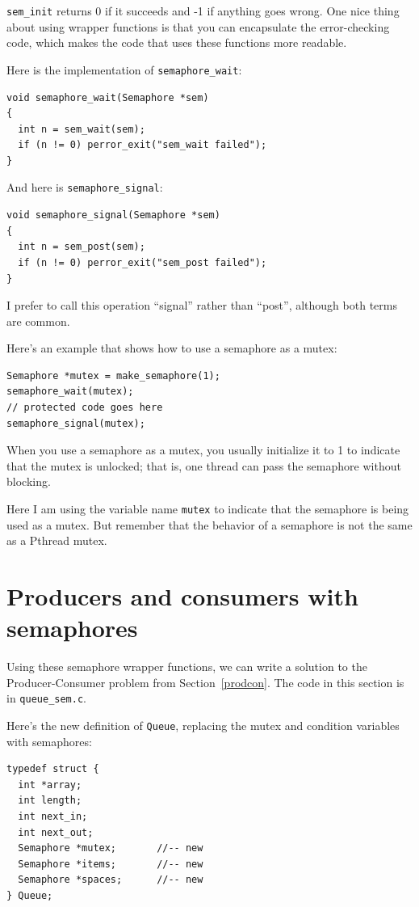 \documentclass[12pt]{book}
\begin{document}
{\tt sem\_init} returns 0 if it succeeds and -1 if anything goes
wrong.  One nice thing about using wrapper functions is that you can
encapsulate the error-checking code, which makes the code that uses
these functions more readable.

Here is the implementation of \verb"semaphore_wait":

\begin{verbatim}
void semaphore_wait(Semaphore *sem)
{
  int n = sem_wait(sem);
  if (n != 0) perror_exit("sem_wait failed");
}
\end{verbatim}

And here is \verb"semaphore_signal":

\begin{verbatim}
void semaphore_signal(Semaphore *sem)
{
  int n = sem_post(sem);
  if (n != 0) perror_exit("sem_post failed");
}
\end{verbatim}

I prefer to call this operation ``signal'' rather than ``post'',
although both terms are common.

Here's an example that shows how to use a semaphore as a mutex:

\begin{verbatim}
Semaphore *mutex = make_semaphore(1);
semaphore_wait(mutex);
// protected code goes here
semaphore_signal(mutex);
\end{verbatim}

When you use a semaphore as a mutex, you usually
initialize it to 1 to indicate
that the mutex is unlocked; that is, one thread can
pass the semaphore without blocking.

Here I am using the variable name {\tt mutex} to indicate that
the semaphore is being used as a mutex.  But remember that the behavior
of a semaphore is not the same as a Pthread mutex.


\section{Producers and consumers with semaphores}

Using these semaphore wrapper functions, we can
write a solution to the Producer-Consumer problem from
Section~\ref{prodcon}.
The code in this section is in \verb"queue_sem.c".

Here's the new definition of {\tt Queue}, replacing the mutex
and condition variables with semaphores:

\begin{verbatim}
typedef struct {
  int *array;
  int length;
  int next_in;
  int next_out;
  Semaphore *mutex;       //-- new
  Semaphore *items;       //-- new
  Semaphore *spaces;      //-- new
} Queue;
\end{verbatim}
\end{document}
